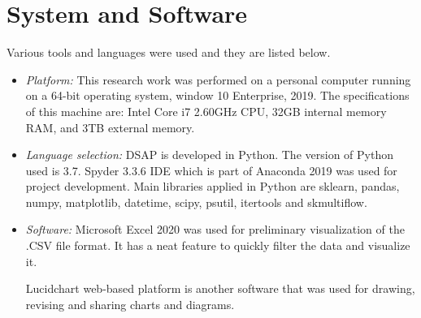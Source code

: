 

% 






\section{System and Software}

Various tools and languages were used and they are listed below.

\begin{itemize}
    \item\textit{Platform:} This research work was performed on a personal computer running on a 64-bit operating system, window 10 Enterprise, 2019. The specifications of this machine are: Intel Core i7 2.60GHz CPU, 32GB internal memory RAM, and 3TB external memory. 
    \item\textit{Language selection:} DSAP is developed in Python. The version of Python used is 3.7. Spyder 3.3.6 IDE which is part of Anaconda 2019 was used for project development. Main libraries applied in Python are sklearn, pandas, numpy, matplotlib, datetime, scipy, psutil, itertools and skmultiflow.
    
    
    \item\textit{Software:} Microsoft Excel 2020 was used for preliminary visualization of the .CSV file format. It has a neat feature to quickly filter the data and visualize it.
    
    Lucidchart web-based platform is another software that was used for drawing, revising and sharing charts and diagrams.
    

\end{itemize}

